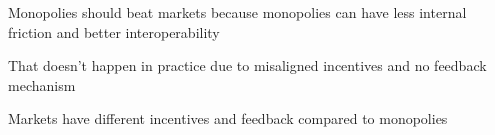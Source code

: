 Monopolies should beat markets because monopolies can have less internal friction and better interoperability 

That doesn't happen in practice due to misaligned incentives and no feedback mechanism

Markets have different incentives and feedback compared to monopolies 
